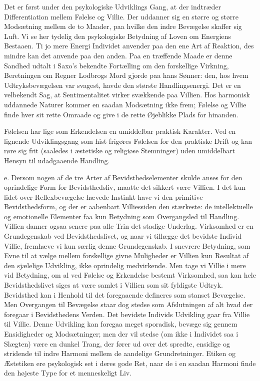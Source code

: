 \documentclass[12pt,a4paper,openany]{book}
\newcommand{\opage}[1]{\marginnote{\footnotesize\textit{[#1]}}}
\begin{document}
Det er først under den psykologiske Udviklings Gang, at der indtræder
Differentiation mellem Følelse og Villie. Der
\opage{118}uddanner sig en større og større Modsætning mellem de to
Maader, paa hvilke den indre Bevægelse skaffer sig Luft. Vi se her
tydelig den psykologiske Betydning af Loven om Energiens Bestaaen. Ti jo
mere Energi Individet anvender paa den ene Art af Reaktion, des mindre
kan det anvende paa den anden. Paa en træffende Maade er denne Sandhed
udtalt i Saxo’s bekendte Fortælling om den forskellige Virkning,
Beretningen om Regner Lodbrogs Mord gjorde paa hans Sønner: den, hos
hvem Udtryksbevægelsen var svagest, havde den største Handlingsenergi.
Det er en velbekendt Sag, at Sentimentalitet virker svækkende paa
Villien. Hos harmonisk uddannede Naturer kommer en saadan Modsætning
ikke frem; Følelse og Villie finde hver sit rette Omraade og give i de
rette Øjeblikke Plads for hinanden.

Følelsen har lige som Erkendelsen en umiddelbar praktisk Karakter. Ved
en lignende Udviklingsgang som hist frigøres Følelsen for den praktiske
Drift og kan røre sig frit (saaledes i æstetiske og religiøse
Stemninger) uden umiddelbart Hensyn til udadgaaende Handling.

e. Dersom nogen af de tre Arter af Bevidsthedselementer skulde anses for
den oprindelige Form for Bevidsthedsliv, maatte det sikkert være
Villien. I det kun lidet over Reflexbevægelse hævede Instinkt have vi
den primitive Bevidsthedsform, og der er aabenbart Villiessiden den
stærkeste: de intellektuelle og emotionelle Elementer faa kun Betydning
som Overgangsled til Handling. Villien danner ogsaa senere paa alle Trin
det stadige Underlag. Virksomhed er en Grundegenskab ved
Bevidsthedslivet, og naar vi tillægge det bevidste Individ Villie,
fremhæve vi kun særlig denne Grundegenskab. I snevrere Betydning, som
Evne til at vælge mellem forskellige givne Muligheder er Villien kun
Resultat af den sjælelige Udvikling, ikke oprindelig medvirkende. Men
tage vi Villie i mere vid Betydning, om al ved Følelse og Erkendelse
bestemt Virksomhed, saa kan hele Bevidsthedslivet siges at være samlet i
Villien som sit fyldigste Udtryk. Bevidsthed kan i Henhold til det
foregaaende defineres som stanset Bevægelse. Men Overgangen til
Bevægelse staar dog stedse som Afslutningen af alt hvad der foregaar i
Bevidsthedens Verden. Det bevidste
\opage{119}Individs Udvikling gaar fra Villie til Villie. Denne
Udvikling kan foregaa meget sporadisk, bevæge sig gennem Ensidigheder og
Modsætninger; men der vil stedse (om ikke i Individet saa i Slægten)
være en dunkel Trang, der fører ud over det spredte, ensidige og
stridende til indre Harmoni mellem de aandelige Grundretninger. Etiken
og Æstetiken ere psykologisk set i deres gode Ret, naar de i en saadan
Harmoni finde den højeste Type for et menneskeligt Liv.
\end{document}
